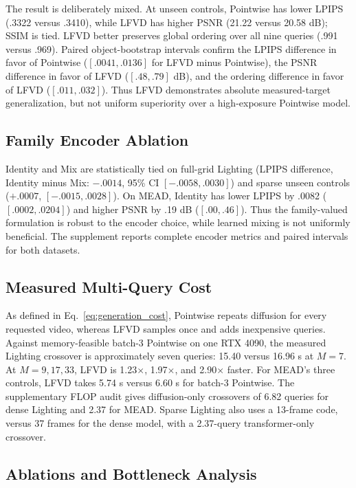 

The result is deliberately mixed. At unseen controls, Pointwise has lower
LPIPS (.3322 versus .3410), while LFVD has higher PSNR (21.22 versus
20.58 dB); SSIM is tied. LFVD better preserves global ordering over all nine
queries (.991 versus .969). Paired object-bootstrap intervals confirm the
LPIPS difference in favor of Pointwise ($[.0041,.0136]$ for LFVD minus
Pointwise), the PSNR difference in favor of LFVD ($[.48,.79]$ dB), and the
ordering difference in favor of LFVD ($[.011,.032]$). Thus LFVD demonstrates
absolute measured-target generalization, but not uniform superiority over a
high-exposure Pointwise model.

\subsection{Family Encoder Ablation}
\label{sec:encoder_ablation}

Identity and Mix are statistically tied on full-grid Lighting (LPIPS
difference, Identity minus Mix: $-.0014$, 95\% CI $[-.0058,.0030]$) and
sparse unseen controls ($+.0007$, $[-.0015,.0028]$). On MEAD, Identity has
lower LPIPS by .0082 ($[.0002,.0204]$) and higher PSNR by .19 dB
($[.00,.46]$). Thus the family-valued formulation is robust to the encoder
choice, while learned mixing is not uniformly beneficial. The supplement
reports complete encoder metrics and paired intervals for both datasets.

\subsection{Measured Multi-Query Cost}
\label{sec:cost}

As defined in Eq.~\ref{eq:generation_cost}, Pointwise repeats diffusion for
every requested video, whereas LFVD samples once and adds inexpensive queries.
Against memory-feasible batch-3 Pointwise on one RTX 4090, the measured
Lighting crossover is approximately seven queries: 15.40 versus 16.96 s at
$M=7$. At $M=9,17,33$, LFVD is 1.23$\times$, 1.97$\times$, and
2.90$\times$ faster. For MEAD's three controls, LFVD takes 5.74 s versus
6.60 s for batch-3 Pointwise. The supplementary FLOP audit gives
diffusion-only crossovers of 6.82 queries for dense Lighting and 2.37 for
MEAD. Sparse Lighting also uses a 13-frame code, versus 37 frames for the
dense model, with a 2.37-query transformer-only crossover.

\subsection{Ablations and Bottleneck Analysis}

